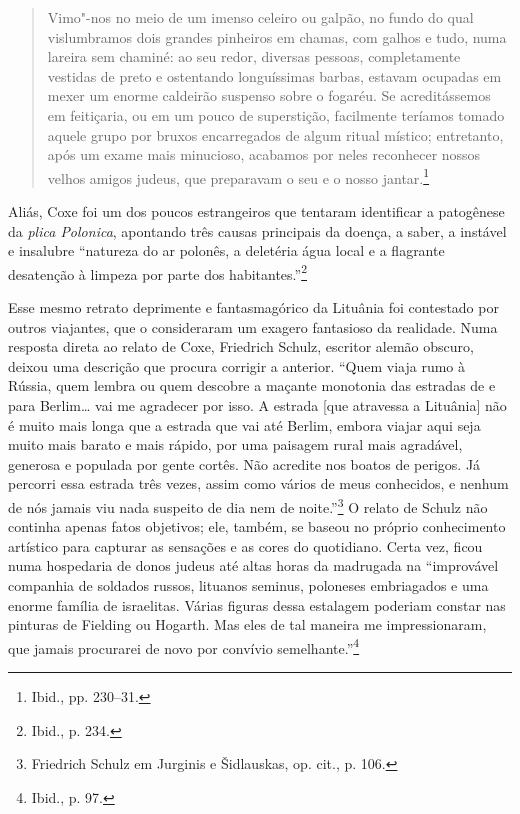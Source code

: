 \begin{quote}
Vimo"-nos no meio de um imenso celeiro ou galpão, no fundo do qual
vislumbramos dois grandes pinheiros em chamas, com galhos e tudo, numa
lareira sem chaminé: ao seu redor, diversas pessoas, completamente
vestidas de preto e ostentando longuíssimas barbas, estavam ocupadas em
mexer um enorme caldeirão suspenso sobre o fogaréu. Se acreditássemos em
feitiçaria, ou em um pouco de superstição, facilmente teríamos tomado
aquele grupo por bruxos encarregados de algum ritual místico;
entretanto, após um exame mais minucioso, acabamos por neles reconhecer
nossos velhos amigos judeus, que preparavam o seu e o nosso
jantar.\footnote{Ibid., pp. 230--31.}
\end{quote}

\asterisc

Aliás, Coxe foi um dos poucos estrangeiros que tentaram identificar a
patogênese da \textit{plica Polonica}, apontando três causas principais da
doença, a saber, a instável e insalubre ``natureza do ar polonês, a
deletéria água local e a flagrante desatenção à limpeza por parte dos
habitantes.''\footnote{Ibid., p. 234.}

Esse mesmo retrato deprimente e fantasmagórico da Lituânia foi
contestado por outros viajantes, que o consideraram um exagero
fantasioso da realidade. Numa resposta direta ao relato de Coxe,
Friedrich Schulz, escritor alemão obscuro, deixou uma descrição que
procura corrigir a anterior. ``Quem viaja rumo à Rússia, quem lembra ou
quem descobre a maçante monotonia das estradas de e para Berlim\ldots{}
vai me agradecer por isso. A estrada {[}que atravessa a Lituânia{]} não
é muito mais longa que a estrada que vai até Berlim, embora viajar aqui
seja muito mais barato e mais rápido, por uma paisagem rural mais
agradável, generosa e populada por gente cortês. Não acredite nos boatos
de perigos. Já percorri essa estrada três vezes, assim como vários de
meus conhecidos, e nenhum de nós jamais viu nada suspeito de dia nem de
noite.''\footnote{Friedrich Schulz em Jurginis e Šidlauskas, op. cit., p. 106.} O relato de Schulz não continha apenas fatos objetivos; ele, também, se baseou no próprio conhecimento artístico para capturar as
sensações e as cores do quotidiano. Certa vez, ficou numa hospedaria de
donos judeus até altas horas da madrugada na ``improvável companhia de
soldados russos, lituanos seminus, poloneses embriagados e uma enorme
família de israelitas. Várias figuras dessa estalagem poderiam constar
nas pinturas de Fielding ou Hogarth. Mas eles de tal maneira me
impressionaram, que jamais procurarei de novo por convívio
semelhante.''\footnote{Ibid., p. 97.}

